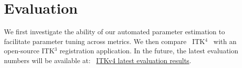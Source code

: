 \documentclass{llncs}
\newcommand{\vect}[1]{\mathbf{#1}}
\renewcommand{\u}{\vect{u}}
\renewcommand{\v}{\vect{v}}
\newcommand{\tk}{~ITK$^{\text{4}}$~}
\begin{document}

\section{Evaluation}
We first investigate the ability of our automated parameter estimation
to facilitate parameter tuning across metrics.  We then compare \tk
with an open-source ITK$^3$ registration application.
In the future, the latest evaluation numbers will be available at:~\textcolor{blue}{
\href{https://github.com/stnava/ITKv4Documentation/tree/wbir2012}{ITKv4 latest
  evaluation results}}.
\end{document}
